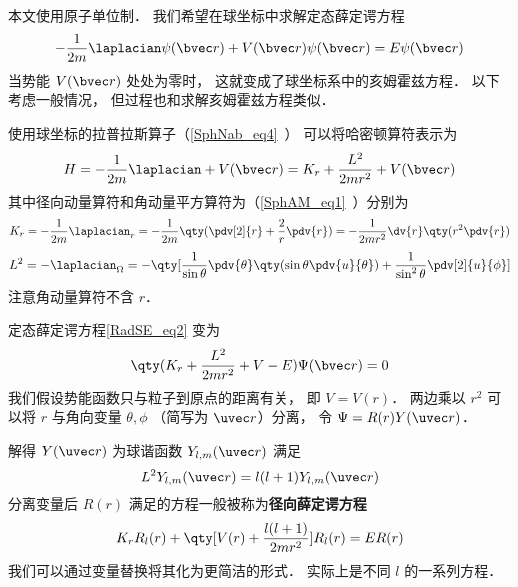 

本文使用原子单位制． 我们希望在球坐标中求解定态薛定谔方程
\begin{equation}\label{RadSE_eq2}
-\frac{1}{2m}\laplacian \psi(\bvec r) + V(\bvec r)\psi(\bvec r) = E\psi(\bvec r)
\end{equation}
当势能 $V(\bvec r)$ 处处为零时， 这就变成了球坐标系中的亥姆霍兹方程． 以下考虑一般情况， 但过程也和求解亥姆霍兹方程类似．

使用球坐标的拉普拉斯算子（\autoref{SphNab_eq4}~） 可以将哈密顿算符表示为
\begin{equation}
H = -\frac{1}{2m} \laplacian + V(\bvec r) =  K_r + \frac{L^2}{2mr^2} + V(\bvec r)
\end{equation}
其中径向动量算符和角动量平方算符为（\autoref{SphAM_eq1}~）分别为
\begin{equation}
K_r =-\frac{1}{2m} \laplacian_r =  - \frac{1}{2m} \qty(\pdv[2]{r} + \frac2r \pdv{r}) = -\frac{1}{2mr^2} \dv{r} \qty(r^2\pdv{r})
\end{equation}
\begin{equation}\label{RadSE_eq3}
L^2 = -\laplacian_\Omega = -\qty[ \frac{1}{\sin\theta} \pdv{\theta} \qty(\sin \theta \pdv{u}{\theta}) + \frac{1}{\sin^2 \theta} \pdv[2]{u}{\phi}]
\end{equation}
注意角动量算符不含 $r$．

定态薛定谔方程\autoref{RadSE_eq2} 变为
\begin{equation}
\qty(K_r + \frac{L^2}{2mr^2} + V - E)\Psi(\bvec r) = 0
\end{equation}
我们假设势能函数只与粒子到原点的距离有关， 即 $V = V(r)$． 两边乘以 $r^2$ 可以将 $r$ 与角向变量 $\theta, \phi$ （简写为 $\uvec r$）分离， 令 $\Psi = R(r)Y(\uvec r)$．

解得 $Y(\uvec r)$ 为球谐函数 $Y_{l,m}(\uvec r)$ 满足
\begin{equation}
L^2 Y_{l,m}(\uvec r) = l(l+1) Y_{l,m}(\uvec r)
\end{equation}
分离变量后 $R(r)$ 满足的方程一般被称为\textbf{径向薛定谔方程}
\begin{equation}\label{RadSE_eq6}
K_r R_l(r) + \qty[V(r) + \frac{l(l+1)}{2mr^2} ]R_l(r) = ER(r)
\end{equation}
我们可以通过变量替换将其化为更简洁的形式． 实际上是不同 $l$ 的一系列方程．

